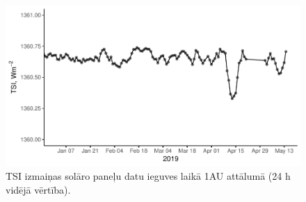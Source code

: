 \begin{figure}[h]
    \centering
    \includegraphics[width=\linewidth]{figures/misc/TSI.pdf}
    \caption{TSI izmaiņas solāro paneļu datu ieguves laikā 1AU attālumā (24 h vidējā vērtība)\cite{TSIdata}.}
    \label{fig:TSI2}
\end{figure}
